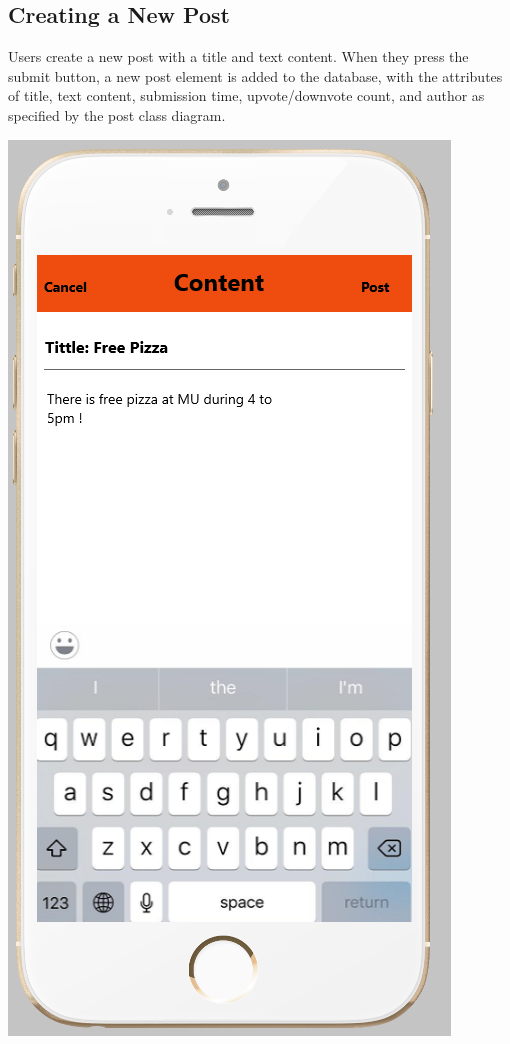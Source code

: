 \documentclass[12pt]{article}
\begin{document}
\subsection{Creating a New Post}
Users create a new post with a title and text content. When they press the submit button, a new post element is added to the database, with the attributes of title, text content, submission time, upvote/downvote count, and author as specified by the post class diagram.
\begin{center}
\includegraphics[scale=0.30]{img/ui/post}

\end{center}
\end{document}
